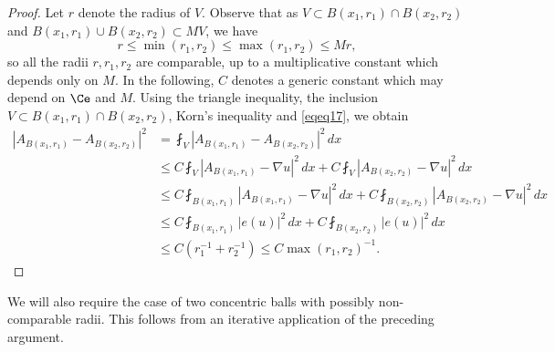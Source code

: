 \documentclass[12pt]{article}
\theoremstyle{definition}
\theoremstyle{remark}
\numberwithin{equation}{section}
\newcommand{\abs}[1]{\lvert #1 \rvert}
\newcommand{\D}{\nabla}
\begin{document}
\begin{proof}
    Let $r$ denote the radius of $V$. Observe that as $V\subset B(x_1,r_1)\cap B(x_2,r_2)$ and $B(x_1,r_1)\cup B(x_2,r_2)\subset MV$, we have
    \begin{equation}
        r \leq \min(r_1,r_2) \leq \max(r_1,r_2) \leq M r,
    \end{equation}
    so all the radii $r, r_1, r_2$ are comparable, up to a multiplicative constant which depends only on $M$.
    In the following, $C$ denotes a generic constant which may depend on $\Ce$ and $M$.
    Using the triangle inequality, the inclusion $V \subset B(x_1,r_1) \cap B(x_2,r_2)$, Korn's inequality and \eqref{eqeq17}, we obtain
    \begin{align*}
        |A_{B(x_1,r_1)}-A_{B(x_2,r_2)}|^2 &= \fint_{V} |A_{B(x_1,r_1)}-A_{B(x_2,r_2)}|^2 \, dx\\
                                          &\leq C \fint_{V} |A_{B(x_1,r_1)}-\nabla u|^2 \, dx + C \fint_{V} |A_{B(x_2,r_2)}-\nabla u|^2 \, dx\\
                                          &\leq C \fint_{B(x_1,r_1)} |A_{B(x_1,r_1)}-\nabla u|^2 \, dx + C \fint_{B(x_2,r_2)} |A_{B(x_2,r_2)}-\nabla u|^2 \, dx\\
                                          &\leq C \fint_{B(x_1,r_1)} \abs{e(u)}^2 \, dx + C \fint_{B(x_2,r_2)} \abs{e(u)}^2 \, dx\\
                                          &\leq C (r_1^{-1} + r_2^{-1}) \leq C \max(r_1,r_2)^{-1}.
    \end{align*}
\end{proof}


We will also require the case of two concentric balls with possibly non-comparable radii. This follows from an iterative
application of the preceding argument.
\end{document}
